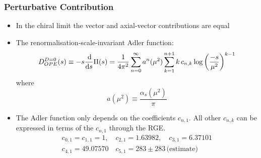 \documentclass{beamer}
\begin{document}
\begin{frame}
  \frametitle{Perturbative Contribution}
  \begin{itemize}
  \item In the chiral limit the vector and axial-vector contributions are equal
  \item The renormalisation-scale-invariant Adler function:
    \begin{equation}
      D_{OPE}^{D=0}(s) \equiv -s \frac{\dif}{\dif s} \Pi(s)
      = \frac{1}{4 \pi^2} \sum_{n=0}^\infty a^n(\mu^2) \sum_{k=1}^{n+1} k\, c_{n,k} \log\left( \frac{-s}{\mu^2} \right)^{k-1}
    \end{equation}
    where
    \begin{equation}
      a(\mu^2) \equiv \frac{\alpha_s(\mu^2)}{\pi}
    \end{equation}
  \item The Adler function only depends on the coefficients \(c_{n,1}\). All
    other \(c_{n,k}\) can be expressed in terms of the \(c_{n,1}\) through the
    RGE.
    \begin{equation}
      \begin{split}
        c_{0,1} = c_{1,1} = 1, \quad c_{2,1} = 1.63982, \quad c_{3,1} = 6.37101 \\
        c_{4,1} = 49.07570 \quad c_{5,1} = 283 \pm 283\, \text{(estimate)}
      \end{split}
    \end{equation}
  \end{itemize}
\end{frame}
\end{document}
